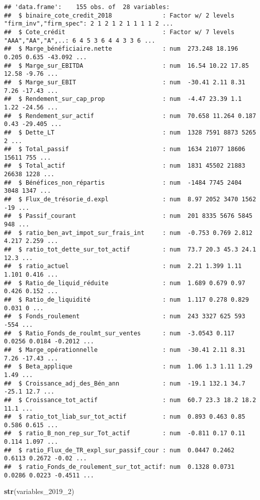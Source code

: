 \documentclass[
]{article}
\newenvironment{Shaded}{\begin{snugshade}}{\end{snugshade}}
\newcommand{\DecValTok}[1]{\textcolor[rgb]{0.00,0.00,0.81}{#1}}
\newcommand{\KeywordTok}[1]{\textcolor[rgb]{0.13,0.29,0.53}{\textbf{#1}}}
\newcommand{\NormalTok}[1]{#1}
\begin{document}
\begin{verbatim}
## 'data.frame':    155 obs. of  28 variables:
##  $ binaire_cote_credit_2018              : Factor w/ 2 levels "firm_inv","firm_spec": 2 1 2 1 2 1 1 1 1 2 ...
##  $ Cote_crédit                           : Factor w/ 7 levels "AAA","AA","A",..: 6 4 5 3 6 4 4 3 3 6 ...
##  $ Marge_bénéficiaire.nette              : num  273.248 18.196 0.205 0.635 -43.092 ...
##  $ Marge_sur_EBITDA                      : num  16.54 10.22 17.85 12.58 -9.76 ...
##  $ Marge_sur_EBIT                        : num  -30.41 2.11 8.31 7.26 -17.43 ...
##  $ Rendement_sur_cap_prop                : num  -4.47 23.39 1.1 1.22 -24.56 ...
##  $ Rendement_sur_actif                   : num  70.658 11.264 0.187 0.43 -29.405 ...
##  $ Dette_LT                              : num  1328 7591 8873 5265 2 ...
##  $ Total_passif                          : num  1634 21077 18606 15611 755 ...
##  $ Total_actif                           : num  1831 45502 21883 26638 1228 ...
##  $ Bénéfices_non_répartis                : num  -1484 7745 2404 3048 1347 ...
##  $ Flux_de_trésorie_d.expl               : num  8.97 2052 3470 1562 -19 ...
##  $ Passif_courant                        : num  201 8335 5676 5845 948 ...
##  $ ratio_ben_avt_impot_sur_frais_int     : num  -0.753 0.769 2.812 4.217 2.259 ...
##  $ ratio_tot_dette_sur_tot_actif         : num  73.7 20.3 45.3 24.1 12.3 ...
##  $ ratio_actuel                          : num  2.21 1.399 1.11 1.101 0.416 ...
##  $ Ratio_de_liquid_réduite               : num  1.689 0.679 0.97 0.426 0.152 ...
##  $ Ratio_de_liquidité                    : num  1.117 0.278 0.829 0.031 0 ...
##  $ Fonds_roulement                       : num  243 3327 625 593 -554 ...
##  $ Ratio_Fonds_de_roulmt_sur_ventes      : num  -3.0543 0.117 0.0256 0.0184 -0.2012 ...
##  $ Marge_opérationnelle                  : num  -30.41 2.11 8.31 7.26 -17.43 ...
##  $ Beta_applique                         : num  1.06 1.3 1.11 1.29 1.49 ...
##  $ Croissance_adj_des_Bén_ann            : num  -19.1 132.1 34.7 -25.1 12.7 ...
##  $ Croissance_tot_actif                  : num  60.7 23.3 18.2 18.2 11.1 ...
##  $ ratio_tot_liab_sur_tot_actif          : num  0.893 0.463 0.85 0.586 0.615 ...
##  $ ratio_B_non_rep_sur_Tot_actif         : num  -0.811 0.17 0.11 0.114 1.097 ...
##  $ ratio_Flux_de_TR_expl_sur_passif_cour : num  0.0447 0.2462 0.6113 0.2672 -0.02 ...
##  $ ratio_Fonds_de_roulement_sur_tot_actif: num  0.1328 0.0731 0.0286 0.0223 -0.4511 ...
\end{verbatim}

\begin{Shaded}
\begin{Highlighting}[]
\KeywordTok{str}\NormalTok{(variables_}\DecValTok{2019}\NormalTok{_}\DecValTok{2}\NormalTok{)}
\end{Highlighting}
\end{Shaded}
\end{document}
